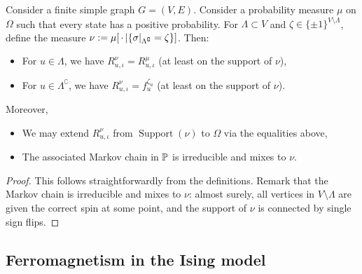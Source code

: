 \begin{lemma}
    \label{lem:conditioning}
    Consider a finite simple graph $G=(V,E)$.
    Consider a probability measure $\mu$ on $\Omega$ such that every state has a positive
    probability.
    For $\Lambda\subset V$ and $\zeta\in\{\pm1\}^{V\setminus\Lambda}$,
    define the measure $\nu:=\mu[\blank|\{\sigma|_{\Lambda^\complement}=\zeta\}]$.
    Then:
    \begin{itemize}
        \item For $u\in\Lambda$, we have $R_{u,\iota}^\nu=R_{u,\iota}^\mu$ (at least on
            the support of $\nu$),
        \item For $u\in\Lambda^\complement$, we have $R_{u,\iota}^\nu=f_u^{\zeta_u}$ (at
            least on the support of $\nu$).
    \end{itemize}

    Moreover,
    \begin{itemize}
        \item We may extend $R_{u,\iota}^\nu$ from $\operatorname{Support}(\nu)$ to
            $\Omega$ via the equalities above,
        \item The associated Markov chain in $\P$ is irreducible and mixes to $\nu$.
    \end{itemize}
\end{lemma}

\begin{proof}
    This follows straightforwardly from the definitions.
    Remark that the Markov chain is irreducible and mixes to $\nu$:
    almost surely, all vertices in $V\setminus\Lambda$ are given the correct spin at some point,
    and the support of $\nu$ is connected by single sign flips.
\end{proof}

\subsection{Ferromagnetism in the Ising model}

